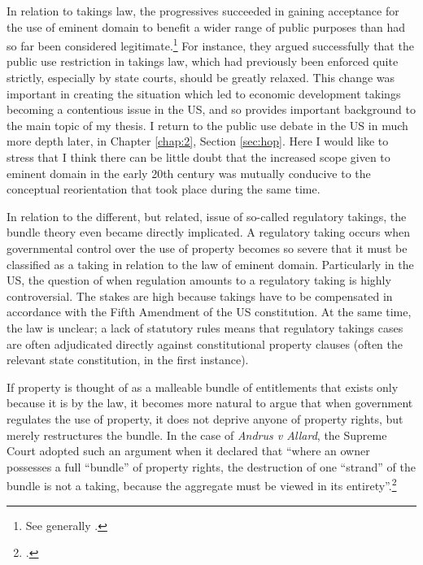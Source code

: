 In relation to takings law, the progressives succeeded in gaining acceptance for the use of eminent domain to benefit a wider range of public purposes than had so far been considered legitimate.\footnote{See generally \cite{yale49}.} For instance, they argued successfully that the public use restriction in takings law, which had previously been enforced quite strictly, especially by state courts, should be greatly relaxed. This change was important in creating the situation which led to economic development takings becoming a contentious issue in the US, and so provides important background to the main topic of my thesis.  I return to the public use debate in the US in much more depth later, in Chapter \ref{chap:2}, Section \ref{sec:hop}. Here I would like to stress that I think there can be little doubt that the increased scope given to eminent domain in the early 20th century was mutually conducive to the conceptual reorientation that took place during the same time.

In relation to the different, but related, issue of so-called regulatory takings, the bundle theory even became directly implicated. A regulatory taking occurs when governmental control over the use of property becomes so severe that it must be classified as a taking in relation to the law of eminent domain. Particularly in the US, the question of when regulation amounts to a regulatory taking is highly controversial. The stakes are high because takings have to be compensated in accordance with the Fifth Amendment of the US constitution. At the same time, the law is unclear; a lack of statutory rules means that regulatory takings cases are often adjudicated directly against constitutional property clauses (often the relevant state constitution, in the first instance).

If property is thought of as a malleable bundle of entitlements that exists only because it is  by the law, it becomes more natural to argue that when government regulates the use of property, it does not deprive anyone of property rights, but merely restructures the bundle. In the case of {\it Andrus v Allard}, the Supreme Court adopted such an argument when it declared that ``where an owner possesses a full ``bundle'' of property rights, the destruction of one ``strand'' of the bundle is not a taking, because the aggregate must be viewed in its entirety''.\footcite[65--66]{andrus79}

